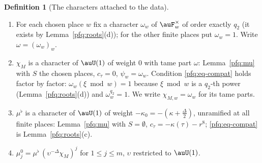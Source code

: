 \documentclass[10pt]{amsart}
\theoremstyle{definition}
\newtheorem{definition}[theorem]{Definition}
\theoremstyle{remark}
\begin{document}
\begin{definition}[The characters attached to the data]\label{pfq:def-chars}
\begin{enumerate}
\item[(i)] For each chosen place $w$ fix a character $\omega_w$ of $\auF_w^\times$ of order exactly $q_2$ (it exists by
Lemma~\ref{pfq:roots}(d)); for the other finite places put $\omega_w=1$. Write $\omega=(\omega_w)_w$.
\item[(ii)] $\chi_M$ is a character of $\auU(1)$ of weight $0$ with tame part $\omega$: Lemma~\ref{pfq:mu} with $S$ the chosen places,
$c_\tau=0$, $\psi_w=\omega_w$. Condition \eqref{pfq:eq-compat} holds factor by factor: $\omega_w(\xi\bmod w)=1$ because $\xi\bmod w$ is a
$q_2$-th power (Lemma~\ref{pfq:roots}(d)) and $\omega_w^{q_2}=1$. We write $\chi_{M,w}=\omega_w$ for its tame parts.
\item[(iii)] $\mu^\flat$ is a character of $\auU(1)$ of weight $-\kappa_0=-(\kappa+\frac\Delta2)$, unramified at all finite places:
Lemma~\ref{pfq:mu} with $S=\emptyset$, $c_\tau=-\kappa(\tau)-r^8$; \eqref{pfq:eq-compat} is Lemma~\ref{pfq:roots}(c).
\item[(iv)] $\mu^0_j=\mu^\flat\,(\upsilon^{-\Delta}\chi_M)^j$ for $1\le j\le m$, $\upsilon$ restricted to $\auU(1)$.
\end{enumerate}
\end{definition}
\end{document}
